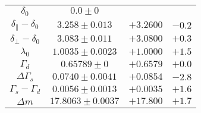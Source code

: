 \documentclass[aspectratio=43,9pt]{beamer}
\begin{document}
\begin{frame}[default]
\begin{tabular}{cccc}
    $                      \delta_0 $&$                 0.0 \pm 0 $\\
    $ \delta_{\parallel} - \delta_0 $&$           3.258 \pm 0.013 $&$ +3.2600 $&$ -0.2 $\\
    $     \delta_{\perp} - \delta_0 $&$           3.083 \pm 0.011 $&$ +3.0800 $&$ +0.3 $\\
    $                     \lambda_0 $&$         1.0035 \pm 0.0023 $&$ +1.0000 $&$ +1.5 $\\
    $                      \Gamma_d $&$             0.65789 \pm 0 $&$ +0.6579 $&$ +0.0 $\\
    $                \Delta\Gamma_s $&$         0.0740 \pm 0.0041 $&$ +0.0854 $&$ -2.8 $\\
    $           \Gamma_s - \Gamma_d $&$         0.0056 \pm 0.0013 $&$ +0.0035 $&$ +1.6 $\\
    $                      \Delta m $&$        17.8063 \pm 0.0037 $&$ +17.800 $&$ +1.7 $\\
  \hline
  \end{tabular}


  
\end{frame}

\end{document}
